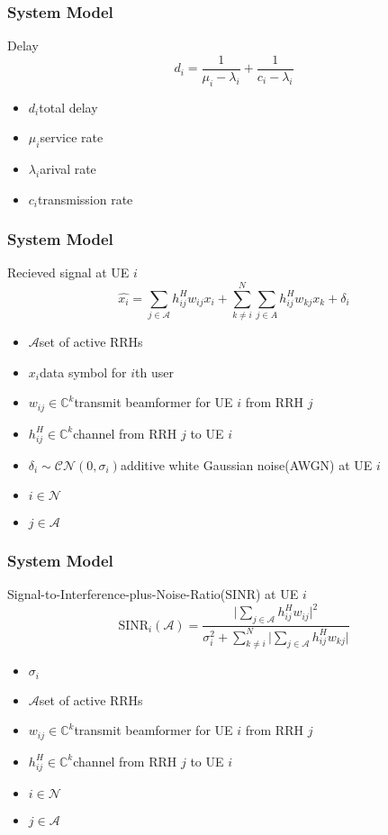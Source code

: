 \documentclass[usenames,dvipsnames]{beamer}
\begin{document}
\begin{frame}
  \frametitle{System Model}
  \begin{exampleblock}{Delay}
    \[
      d_{i} = \frac{1}{\mu_{i}- \lambda_{i}} + \frac{1}{c_{i} - \lambda_{i}}
    \]
  \end{exampleblock}
  \begin{itemize}
    \item  $d_{i}$\quad total delay
    \item $\mu_{i}$\quad service rate
    \item $\lambda_{i}$\quad arival rate
    \item $c_{i}$\quad transmission rate
  \end{itemize}
\end{frame}
\begin{frame}
  \frametitle{System Model}
  \begin{exampleblock}{Recieved signal at UE $i$}
    \[
      \hat{x_{i}} = \sum_{j\in{\mathcal{A}}}^{}h_{ij}^{H}w_{ij}x_{i} + \sum_{k\neq i}^{N}\sum_{j\in{A}}^{}h_{ij}^{H}w_{kj}x_{k} + \delta_{i}
    \]
  \end{exampleblock}
  \begin{itemize}
    \item $\mathcal{A}$\qquad set of active RRHs
    \item $x_{i}$\qquad data symbol for $i$th user
    \item $w_{ij}\in\mathbb{C}^{k}$\quad transmit beamformer for UE $i$ from RRH $j$
    \item $h_{ij}^{H}\in\mathbb{C}^{k}$\quad channel from RRH $j$ to UE $i$
    \item $\delta_{i}\sim\mathcal{C}\mathcal{N}(0,\sigma_{i})$\quad additive white Gaussian noise(AWGN) at UE $i$
    \item $i\in\mathcal{N}$
    \item $j\in\mathcal{A}$
  \end{itemize}
\end{frame}
\begin{frame}
  \frametitle{System Model}
  \begin{exampleblock}{Signal-to-Interference-plus-Noise-Ratio(SINR) at UE $i$}
    \[
      \text{SINR}_{i}(\mathcal{A}) = \frac{\bigg\lvert\sum\limits_{j\in{\mathcal{A}}}^{}h_{ij}^{H}w_{ij}\bigg\rvert^2}{\sigma_{i}^2 + \sum\limits_{k\neq i}^{N}\bigg\lvert\sum\limits_{j\in{\mathcal{A}}}^{}h_{ij}^{H}w_{kj}\bigg\rvert}
    \]
  \end{exampleblock}
  \begin{itemize}
    \item $\sigma_{i}$
    \item $\mathcal{A}$\qquad set of active RRHs
    \item $w_{ij}\in\mathbb{C}^{k}$\quad transmit beamformer for UE $i$ from RRH $j$
    \item $h_{ij}^{H}\in\mathbb{C}^{k}$\quad channel from RRH $j$ to UE $i$
    \item $i\in\mathcal{N}$
    \item $j\in\mathcal{A}$
  \end{itemize}
\end{frame}
\end{document}
